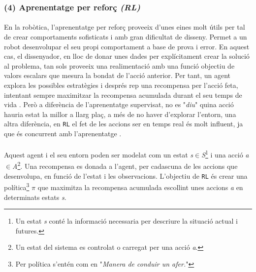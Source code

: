 \documentclass[12pt,a4paper,final,twoside]{article}
\begin{document}
\subsubsection*{(4) Aprenentatge per reforç \textit{(RL)}}

\paragraph{}En la robòtica, l'aprenentatge per reforç proveeix d'unes eines molt útils per tal de crear comportaments sofisticats i amb gran dificultat de disseny. Permet a un robot desenvolupar el seu propi comportament a base de prova i error. En aquest cas, el dissenyador, en lloc de donar unes dades per explícitament crear la solució al problema, tan sols proveeix una realimentació amb una funció objectiu de valors escalars que mesura la bondat de l'acció anterior. Per tant, un agent explora les possibles estratègies i després rep una recompensa per l'acció feta, intentant sempre maximitzar la recompensa acumulada durant el seu temps de vida \cite{Kober2009}. Però a diferència de l'aprenentatge supervisat, no es "\textit{diu}" quina acció hauria estat la millor a llarg plaç, a més de no haver d'explorar l'entorn, una altra diferència, en \texttt{RL} el fet de les accions ser en temps real és molt influent, ja que és concurrent amb l'aprenentatge \cite{Kaelbling1996}. 

\paragraph{}Aquest agent i el seu entorn poden ser modelat com un estat \textit{s}$\in$\textit{S}\footnote{Un estat \textit{s} conté la informació necessaria per descriure la situació actual i futures.} i una acció \textit{a}$\in$\textit{A}\footnote{Un estat del sistema es controlat o carregat per una acció \textit{a}.}. Una recompensa es donada a l'agent, per cadascuna de les accions que desenvolupa, en funció de l'estat i les observacions. L'objectiu de \texttt{RL} és crear una política\footnote{Per política s'entén com en \cite{iec-dlc} "\textit{Manera de conduir un afer.}"} $\pi$ que maximitza la recompensa acumulada escollint unes accions \textit{a} en determinats estats \textit{s}.
\end{document}

